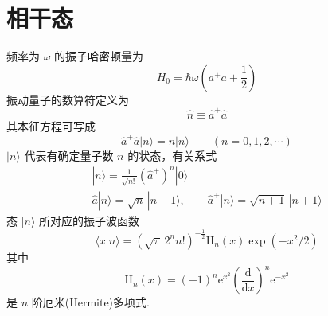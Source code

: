 %
\chapter{相干态}

频率为 $\omega$ 的振子哈密顿量为
\begin{equation}
  H_{0}=\hbar\omega\left(a^{+}a+\frac{1}{2}\right)
\end{equation}
振动量子的数算符定义为
\begin{equation}
  \hat{n}\equiv\hat{a}^{+}\hat{a}
\end{equation}
其本征方程可写成
\begin{equation}
  \hat{a}^{+}\hat{a}|n\rangle=n|n\rangle
  \qquad(n=0,1,2,\cdots)
\end{equation}
$|n\rangle$ 代表有确定量子数 $n$ 的状态，有关系式
\begin{equation}
\begin{gathered}
  |n\rangle=\frac{1}{\sqrt{n!}}
  \left(\hat{a}^{+}\right)^{n}|0\rangle\\
  \hat{a}|n\rangle=\sqrt{n}\,|n-1\rangle
  ,\qquad
  \hat{a}^{+}|n\rangle=\sqrt{n+1}\,|n+1\rangle
\end{gathered}
\end{equation}
态 $|n\rangle$ 所对应的振子波函数
\begin{equation}
  \langle x|n\rangle=\left(\sqrt{\pi}\,2^{n}n!\right)^{-\frac{1}{2}}
  \mathrm{H}_{n}(x)\exp\left(-x^{2}/2\right)
\end{equation}
其中
\begin{equation}
  \mathrm{H}_{n}(x)=(-1)^{n}\mathrm{e}^{x^{2}}
  \left(\frac{\mathrm{d}}{\mathrm{d}x}\right)^{n}
  \mathrm{e}^{-x^{2}}
\end{equation}
是 $n$ 阶厄米(Hermite)多项式.

